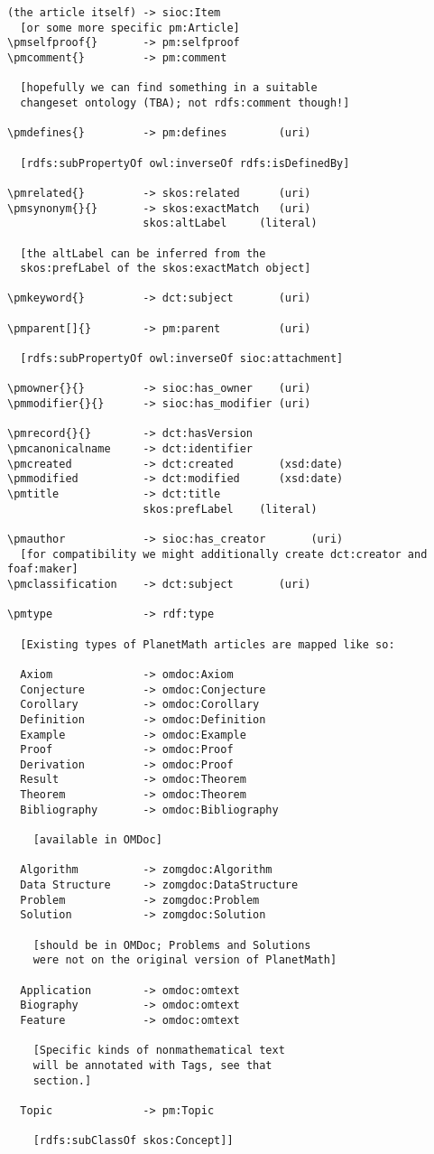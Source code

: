 \documentclass{article}
\begin{document}
\begin{verbatim}
(the article itself) -> sioc:Item
  [or some more specific pm:Article]
\pmselfproof{}       -> pm:selfproof
\pmcomment{}         -> pm:comment

  [hopefully we can find something in a suitable
  changeset ontology (TBA); not rdfs:comment though!]

\pmdefines{}         -> pm:defines        (uri)

  [rdfs:subPropertyOf owl:inverseOf rdfs:isDefinedBy]

\pmrelated{}         -> skos:related      (uri)
\pmsynonym{}{}       -> skos:exactMatch   (uri)
                     skos:altLabel     (literal)

  [the altLabel can be inferred from the
  skos:prefLabel of the skos:exactMatch object]

\pmkeyword{}         -> dct:subject       (uri)

\pmparent[]{}        -> pm:parent         (uri)

  [rdfs:subPropertyOf owl:inverseOf sioc:attachment]

\pmowner{}{}         -> sioc:has_owner    (uri)
\pmmodifier{}{}      -> sioc:has_modifier (uri)

\pmrecord{}{}        -> dct:hasVersion
\pmcanonicalname     -> dct:identifier
\pmcreated           -> dct:created       (xsd:date)
\pmmodified          -> dct:modified      (xsd:date)
\pmtitle             -> dct:title
                     skos:prefLabel    (literal)

\pmauthor            -> sioc:has_creator       (uri)
  [for compatibility we might additionally create dct:creator and foaf:maker]
\pmclassification    -> dct:subject       (uri)

\pmtype              -> rdf:type

  [Existing types of PlanetMath articles are mapped like so:

  Axiom              -> omdoc:Axiom
  Conjecture         -> omdoc:Conjecture
  Corollary          -> omdoc:Corollary
  Definition         -> omdoc:Definition
  Example            -> omdoc:Example
  Proof              -> omdoc:Proof
  Derivation         -> omdoc:Proof
  Result             -> omdoc:Theorem
  Theorem            -> omdoc:Theorem
  Bibliography       -> omdoc:Bibliography

    [available in OMDoc]

  Algorithm          -> zomgdoc:Algorithm
  Data Structure     -> zomgdoc:DataStructure
  Problem            -> zomgdoc:Problem
  Solution           -> zomgdoc:Solution

    [should be in OMDoc; Problems and Solutions
    were not on the original version of PlanetMath]

  Application        -> omdoc:omtext
  Biography          -> omdoc:omtext
  Feature            -> omdoc:omtext

    [Specific kinds of nonmathematical text
    will be annotated with Tags, see that
    section.]

  Topic              -> pm:Topic

    [rdfs:subClassOf skos:Concept]]
\end{verbatim}
\end{document}
